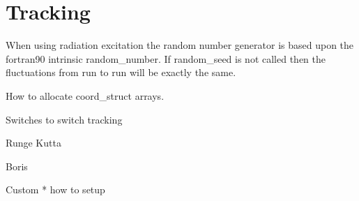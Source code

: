 \chapter{Tracking}

When using radiation excitation the random number generator is based
upon the fortran90 intrinsic random\_number. If random\_seed is not called
then the fluctuations from run to run will be exactly the same.


How to allocate coord\_struct arrays. 

  Switches to switch tracking

  Runge Kutta

  Boris

  Custom
    * how to setup

